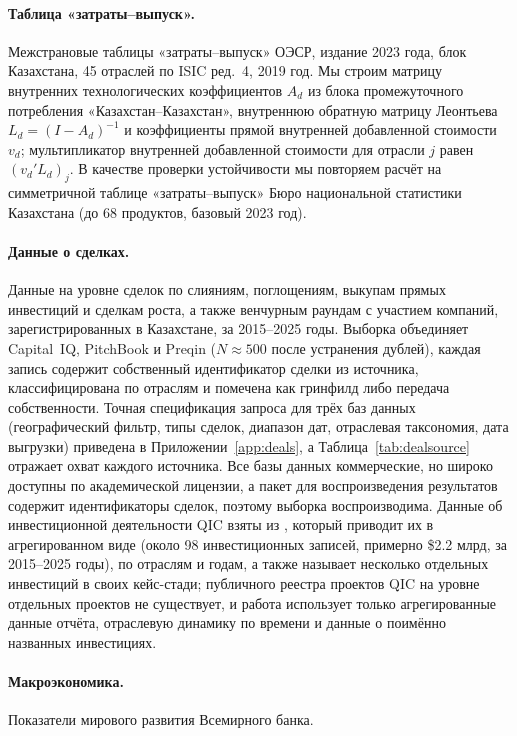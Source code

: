 \documentclass[12pt]{article}
\begin{document}
\paragraph{Таблица «затраты--выпуск».} Межстрановые таблицы «затраты--выпуск» ОЭСР, издание
2023 года, блок Казахстана, 45 отраслей по ISIC ред.~4, 2019 год. Мы строим матрицу
внутренних технологических коэффициентов $A_d$ из блока промежуточного потребления
«Казахстан--Казахстан», внутреннюю обратную матрицу Леонтьева
$L_d = (I-A_d)^{-1}$ и коэффициенты прямой внутренней добавленной стоимости $v_d$;
мультипликатор внутренней добавленной стоимости для отрасли $j$ равен $(v_d' L_d)_j$. В
качестве проверки устойчивости мы повторяем расчёт на симметричной таблице
«затраты--выпуск» Бюро национальной статистики Казахстана (до 68 продуктов, базовый
2023 год).

\paragraph{Данные о сделках.} Данные на уровне сделок по слияниям, поглощениям, выкупам
прямых инвестиций и сделкам роста, а также венчурным раундам с участием компаний,
зарегистрированных в Казахстане, за 2015--2025 годы. Выборка объединяет Capital~IQ,
PitchBook и Preqin ($N \approx 500$ после устранения дублей), каждая запись содержит
собственный идентификатор сделки из источника, классифицирована по отраслям и помечена как
гринфилд либо передача собственности. Точная спецификация запроса для трёх баз данных
(географический фильтр, типы сделок, диапазон дат, отраслевая таксономия, дата выгрузки)
приведена в Приложении~\ref{app:deals}, а Таблица~\ref{tab:dealsource} отражает охват
каждого источника. Все базы данных коммерческие, но широко доступны по академической
лицензии, а пакет для воспроизведения результатов содержит идентификаторы сделок, поэтому
выборка воспроизводима. Данные об инвестиционной деятельности QIC взяты из
\citet{qicaifcifc2026pe}, который приводит их в агрегированном виде (около 98
инвестиционных записей, примерно \$2.2 млрд, за 2015--2025 годы), по отраслям и годам, а
также называет несколько отдельных инвестиций в своих кейс-стади; публичного реестра
проектов QIC на уровне отдельных проектов не существует, и работа использует только
агрегированные данные отчёта, отраслевую динамику по времени и данные о поимённо названных
инвестициях.

\paragraph{Макроэкономика.} Показатели мирового развития Всемирного банка.
\end{document}
